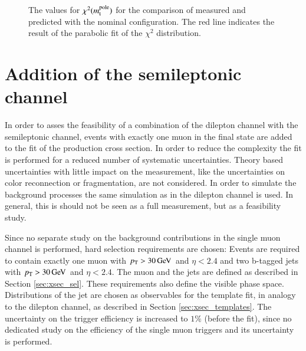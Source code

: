 \begin{figure}[htbp!]
  \begin{center}

\caption{The values for $\chi^2(m_\mathrm{t}^{\mathrm{pole}})$ for the comparison of measured and predicted \sttbar with the nominal configuration. The red line indicates the result of the parabolic fit of the $\chi^2$ distribution. 
       \label{fig:res_polemass}}
  \end{center}
\end{figure}

\section{Addition of the semileptonic channel}
\label{sec:res_semi}

In order to asses the feasibility of a combination of the dilepton channel with the semileptonic channel, events with exactly one muon in the final state are added to the fit of the \ttbar production cross section.
In order to reduce the complexity the fit is performed for a reduced number of systematic uncertainties. Theory based uncertainties with little impact on the measurement, like the uncertainties
on color reconnection or fragmentation, are not considered. 
In order to simulate the background processes the same simulation as in the dilepton channel is used.
In general, this is should not be seen as a full measurement, but as a feasibility study.

Since no separate study on the background contributions in the single muon channel is performed, hard selection requirements are chosen:
Events are required to contain exactly one muon with $p_{\mathrm{T}} > 30 \,\text{Ge\hspace{-.08em}V}$ and $\eta < 2.4$ and two b-tagged jets with $p_{\mathrm{T}} > 30 \,\text{Ge\hspace{-.08em}V}$ and $\eta < 2.4$.
The muon and the jets are defined as described in Section \ref{sec:xsec_sel}.
These requirements also define the visible phase space.
Distributions of the jet \pt are chosen as observables for the template fit, in analogy to the dilepton channel, as described in Section \ref{sec:xsec_templates}.
The uncertainty on the trigger efficiency is increased to $1\%$ (before the fit), since no dedicated study on the efficiency of the single muon triggers and its uncertainty is performed.

